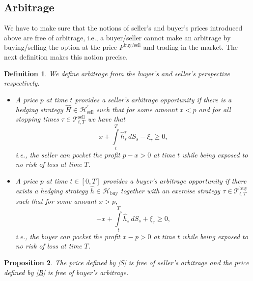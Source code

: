 \documentclass{article}
\newtheorem{definition}{Definition}[section]
\newtheorem{proposition}[definition]{Proposition}
\begin{document}
\subsection{Arbitrage}

We have to make sure that the notions of seller's and buyer's prices introduced above are free of arbitrage, i.e., a buyer/seller cannot make an arbitrage by buying/selling the option at the price $P^\text{buy/sell}$ and trading in the market. The next definition makes this notion precise.

\begin{definition}
	We define arbitrage from the buyer's and seller's perspective respectively.
	\begin{itemize}
	\item \label{def:sellersarbitrage}
		A price $p$ at time $t$ provides a \textit{seller's arbitrage opportunity} if there is a hedging strategy $\hat{H} \in \mathcal{H}^\prime_{\text{sell}}$ such that for 
		some amount $x < p$ and  for all stopping times $\tau \in \mathcal{T}_{t,T}^\text{sell}$ we have that
		\[
			x + \int \limits_{t}^{T} \hat{h}^\tau_{s} \,dS_{s} - \xi_{\tau} \geq 0,
		\]
		i.e., the seller can pocket the profit $p-x>0$ at time $t$ while being exposed to no risk of loss at time $T$.
	\item \label{def:buyersarbitrage}
		A price $p$ at time $t \in [0,T]$  provides a \textit{buyer's arbitrage opportunity} if there exists a hedging strategy $\hat{h} \in \mathcal{H}_{\text{buy}}$ together 
		with an exercise strategy $\tau \in \mathcal{T}^{\text{buy}}_{t,T}$ such that for some amount $x > p$, 
		\[
			-x + \int \limits_{t}^{T} \hat{h}_{s} \,dS_{s} + \xi_{\tau} \geq 0,
		\]
		i.e., the buyer can pocket the profit $x-p>0$ at time $t$ while being exposed to no risk of loss at time $T$.
	\end{itemize}
\end{definition}

\begin{proposition}\label{prop:arbitrage}
	The price defined by \eqref{S} is free of seller's arbitrage and the price defined by \eqref{B} is free of buyer's arbitrage.
\end{proposition}
\end{document}

